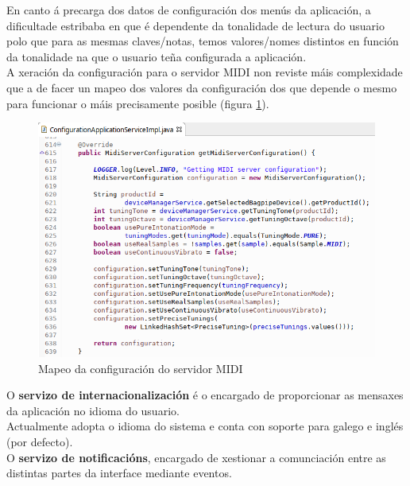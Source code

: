    En canto á precarga dos datos de configuración dos menús da aplicación, a
   dificultade estribaba en que é dependente da tonalidade de lectura do usuario
   polo que para as mesmas claves/notas, temos valores/nomes distintos en
   función da tonalidade na que o usuario teña configurada a aplicación. \\
   
   A xeración da configuración para o servidor MIDI non reviste máis
   complexidade que a de facer un mapeo dos valores da configuración dos que
   depende o mesmo para funcionar o máis precisamente posible (figura
   \ref{figura:MapeoConfiguracionServidorMIDI}). \\
   
   \begin{figure}[htbp]
    \centering
    \includegraphics[scale=0.6, keepaspectratio=true]{./imagenes/mapeo-conf-servidor-midi.png}
    \caption{Mapeo da configuración do servidor MIDI}
    \label{figura:MapeoConfiguracionServidorMIDI}
   \end{figure}
   
   O \textbf{servizo de internacionalización} é o encargado de proporcionar as
   mensaxes da aplicación no idioma do usuario. \\
   
   Actualmente adopta o idioma do sistema e conta con soporte para galego e
   inglés (por defecto). \\
   
   O \textbf{servizo de notificacións}, encargado de xestionar a comunciación
   entre as distintas partes da interface mediante eventos. \\
   
